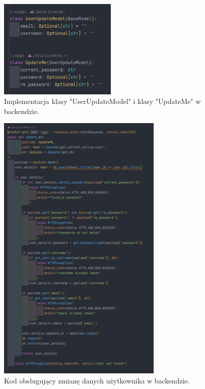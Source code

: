 \begin{figure}[H]
    \centering
    \includegraphics[width=0.5\textwidth]{chapters/chapter_8/screens/edit_user_backend_1}
    \caption{Implementacja klasy "UserUpdateModel" i klasy "UpdateMe" w backendzie.}
    \label{img:edit_user_backend_1}
\end{figure}

\begin{figure}[H]
    \centering
    \includegraphics[width=0.7\textwidth]{chapters/chapter_8/screens/edit_user_backend_2}
    \caption{Kod obsługujący zmianę danych użytkownika w backendzie.}
    \label{img:edit_user_backend_2}
\end{figure}

